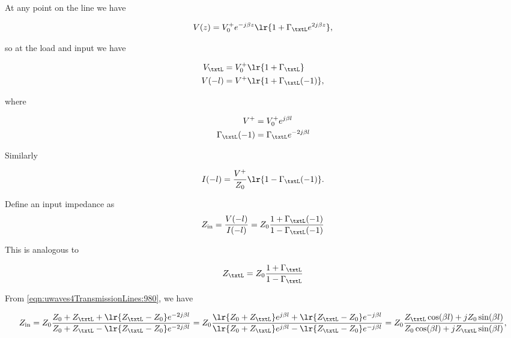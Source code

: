 
At any point on the line we have

\begin{dmath}\label{eqn:uwaves4TransmissionLinesCore:1320}
V(z) = V_0^{+} e^{-j \beta z} \lr{ 1 + \Gamma_\txtL e^{2 j \beta z} },
\end{dmath}

so at the load and input we have

\begin{equation}\label{eqn:uwaves4TransmissionLinesCore:1340}
\begin{aligned}
V_\txtL &= V_0^{+} \lr{ 1 + \Gamma_\txtL } \\
V(-l) &= V^{+} \lr{ 1 + \Gamma_\txtL(-1) },
\end{aligned}
\end{equation}

where

\begin{equation}\label{eqn:uwaves4TransmissionLinesCore:1360}
\begin{aligned}
V^{+} &= V_0^{+} e^{ j \beta l } \\
\Gamma_\txtL(-1) &= \Gamma_\txtL e^{-2 j \beta l} 
\end{aligned}
\end{equation}

Similarly 

\begin{equation}\label{eqn:uwaves4TransmissionLinesCore:1380}
I(-l) = \frac{V^{+}}{Z_0} \lr{ 1 - \Gamma_\txtL(-1) }.
\end{equation}

Define an input impedance as
\begin{dmath}\label{eqn:uwaves4TransmissionLinesCore:1400}
Z_{\textrm{in}} 
= \frac{V(-l)}{I(-l)}
= Z_0 \frac{1 + \Gamma_\txtL(-1)}{1 - \Gamma_\txtL(-1)}
\end{dmath}

This is analogous to 

\begin{dmath}\label{eqn:uwaves4TransmissionLinesCore:1420}
Z_\txtL
= Z_0 \frac{1 + \Gamma_\txtL}{1 - \Gamma_\txtL}
\end{dmath}

From \cref{eqn:uwaves4TransmissionLines:980}, we have

\begin{dmath}\label{eqn:uwaves4TransmissionLinesCore:1440}
Z_{\textrm{in}} 
= Z_0 \frac{Z_0 + Z_\txtL + \lr{Z_\txtL - Z_0} e^{-2 j \beta l}}{Z_0 + Z_\txtL - \lr{Z_\txtL - Z_0} e^{-2 j \beta l}}
= Z_0 \frac{\lr{Z_0 + Z_\txtL} e^{j\beta l} + \lr{Z_\txtL - Z_0} e^{- j \beta l}}{\lr{Z_0 + Z_\txtL} e^{j\beta l} - \lr{Z_\txtL - Z_0} e^{- j \beta l}}
= Z_0 
\frac
{Z_\txtL \cos( \beta l ) + j Z_0 \sin(\beta l ) }
{Z_0 \cos( \beta l ) + j Z_\txtL \sin(\beta l ) },
\end{dmath}

